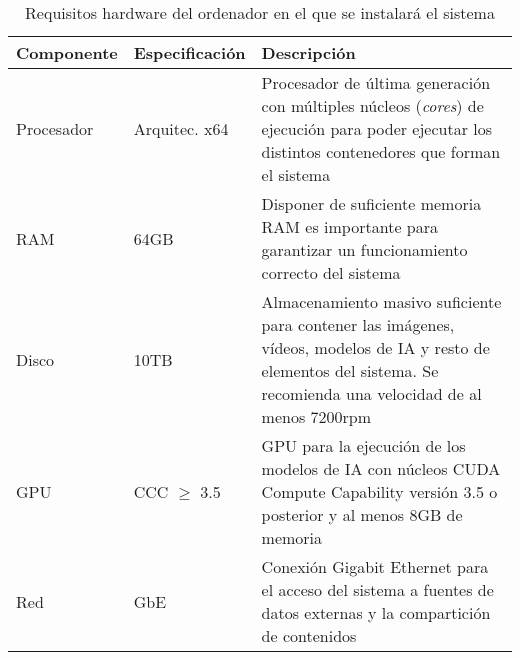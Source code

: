 \begin{table}[ht!]
  \centering
  \small
  \def\arraystretch{1.5}
  \begin{tabular}{llp{10cm}}
    \toprule
      \textbf{Componente} & \textbf{Especificación} & \textbf{Descripción} \\
    \midrule
      Procesador & Arquitec. x64  & Procesador de última generación con múltiples núcleos (\textit{cores}) de ejecución para poder ejecutar los distintos contenedores que forman el sistema \\
      
      RAM        & 64GB  & Disponer de suficiente memoria RAM es importante para garantizar un funcionamiento correcto del sistema \\
      
      Disco      & 10TB  & Almacenamiento masivo suficiente para contener las imágenes, vídeos, modelos de IA y resto de elementos del sistema. Se recomienda una velocidad de al menos 7200rpm \\
      
      GPU        & CCC $\ge$ 3.5 & GPU para la ejecución de los modelos de IA con núcleos CUDA Compute Capability versión 3.5 o posterior y al menos 8GB de memoria \\
      
      Red        & GbE & Conexión Gigabit Ethernet para el acceso del sistema a fuentes de datos externas y la compartición de contenidos \\
    \bottomrule
  \end{tabular}
  \caption{Requisitos hardware del ordenador en el que se instalará el sistema}
  \label{Tabla.Requisitos}
\end{table}
